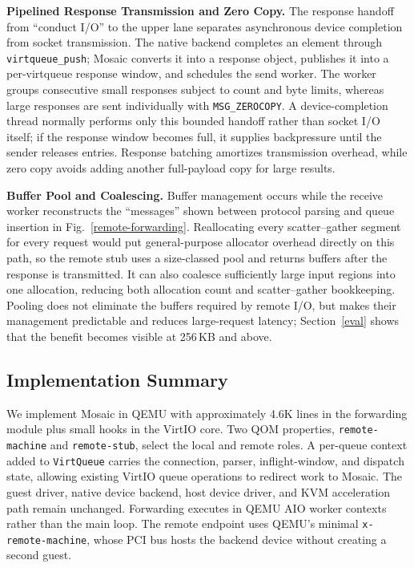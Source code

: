 \documentclass[sigplan,10pt]{acmart}
\begin{document}
\textbf{Pipelined Response Transmission and Zero Copy.} The response handoff from ``conduct I/O'' to the upper lane separates asynchronous device completion from socket transmission. The native backend completes an element through \texttt{virtqueue\_push}; Mosaic converts it into a response object, publishes it into a per-virtqueue response window, and schedules the send worker. The worker groups consecutive small responses subject to count and byte limits, whereas large responses are sent individually with \texttt{MSG\_ZEROCOPY}. A device-completion thread normally performs only this bounded handoff rather than socket I/O itself; if the response window becomes full, it supplies backpressure until the sender releases entries. Response batching amortizes transmission overhead, while zero copy avoids adding another full-payload copy for large results.

\textbf{Buffer Pool and Coalescing.} Buffer management occurs while the receive worker reconstructs the ``messages'' shown between protocol parsing and queue insertion in Fig.~\ref{remote-forwarding}. Reallocating every scatter--gather segment for every request would put general-purpose allocator overhead directly on this path, so the remote stub uses a size-classed pool and returns buffers after the response is transmitted. It can also coalesce sufficiently large input regions into one allocation, reducing both allocation count and scatter--gather bookkeeping. Pooling does not eliminate the buffers required by remote I/O, but makes their management predictable and reduces large-request latency; Section~\ref{eval} shows that the benefit becomes visible at 256\,KB and above.

\subsection{Implementation Summary}
We implement Mosaic in QEMU with approximately 4.6K lines in the forwarding module plus small hooks in the VirtIO core. Two QOM properties, \texttt{remote-machine} and \texttt{remote-stub}, select the local and remote roles. A per-queue context added to \texttt{VirtQueue} carries the connection, parser, inflight-window, and dispatch state, allowing existing VirtIO queue operations to redirect work to Mosaic. The guest driver, native device backend, host device driver, and KVM acceleration path remain unchanged. Forwarding executes in QEMU AIO worker contexts rather than the main loop. The remote endpoint uses QEMU's minimal \texttt{x-remote-machine}, whose PCI bus hosts the backend device without creating a second guest.
\end{document}
